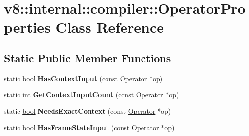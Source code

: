\hypertarget{classv8_1_1internal_1_1compiler_1_1OperatorProperties}{}\section{v8\+:\+:internal\+:\+:compiler\+:\+:Operator\+Properties Class Reference}
\label{classv8_1_1internal_1_1compiler_1_1OperatorProperties}
\subsection*{Static Public Member Functions}
\begin{DoxyCompactItemize}
\item 
\mbox{\label{classv8_1_1internal_1_1compiler_1_1OperatorProperties_a91d024c4a206ff40b8babff4247615d9}} 
static \mbox{\hyperlink{classbool}{bool}} {\bfseries Has\+Context\+Input} (const \mbox{\hyperlink{classv8_1_1internal_1_1compiler_1_1Operator}{Operator}} $\ast$op)
\item 
\mbox{\label{classv8_1_1internal_1_1compiler_1_1OperatorProperties_a842c644f8823aea5528e4d955917157a}} 
static \mbox{\hyperlink{classint}{int}} {\bfseries Get\+Context\+Input\+Count} (const \mbox{\hyperlink{classv8_1_1internal_1_1compiler_1_1Operator}{Operator}} $\ast$op)
\item 
\mbox{\label{classv8_1_1internal_1_1compiler_1_1OperatorProperties_a9d81a964d29345dbcc59a05a9dea5c87}} 
static \mbox{\hyperlink{classbool}{bool}} {\bfseries Needs\+Exact\+Context} (const \mbox{\hyperlink{classv8_1_1internal_1_1compiler_1_1Operator}{Operator}} $\ast$op)
\item 
\mbox{\label{classv8_1_1internal_1_1compiler_1_1OperatorProperties_a95bf8e598a263aba435922caedfd9b78}} 
static \mbox{\hyperlink{classbool}{bool}} {\bfseries Has\+Frame\+State\+Input} (const \mbox{\hyperlink{classv8_1_1internal_1_1compiler_1_1Operator}{Operator}} $\ast$op)
\item 
\mbox{\label{classv8_1_1internal_1_1compiler_1_1OperatorProperties_aa970519f3995a5315a9d510e57a03484}} 

\end{DoxyCompactItemize}

